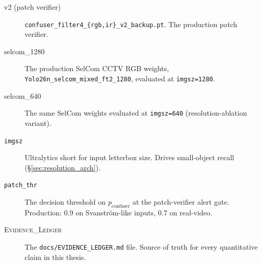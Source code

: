\documentclass[12pt,a4paper,oneside,openright]{book}
\begin{document}
\begin{description}
    \item[v2 (patch verifier)] \texttt{confuser\_filter4\_\{rgb,ir\}\_v2\_backup.pt}. The production patch verifier.
    \item[selcom\_1280] The production SelCom CCTV RGB weights, \texttt{Yolo26n\_selcom\_mixed\_ft2\_1280}, evaluated at \texttt{imgsz=1280}.
    \item[selcom\_640] The same SelCom weights evaluated at \texttt{imgsz=640} (resolution-ablation variant).
    \item[\texttt{imgsz}] Ultralytics short for input letterbox size. Drives small-object recall (\S\ref{sec:resolution_arch}).
    \item[\texttt{patch\_thr}] The decision threshold on $p_\text{confuser}$ at the patch-verifier alert gate. Production: 0.9 on Svanstr\"om-like inputs, 0.7 on real-video.
    \item[\textsc{Evidence\_Ledger}] The \texttt{docs/EVIDENCE\_LEDGER.md} file. Source of truth for every quantitative claim in this thesis.
\end{description}

\backmatter
\sloppy
\printbibliography[heading=bibintoc, title=Bibliography]

\end{document}
